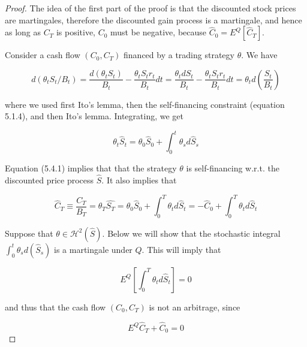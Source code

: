 \documentclass[\topdir/lecture\_notes.tex]{subfiles}
\begin{document}
\begin{proof}
The idea of the first part of the proof is that the discounted stock prices are martingales, therefore the discounted gain process is a martingale, and hence as long as \(C_{T}\) is positive, \(C_{0}\) must be negative, because \(\hat{C}_{0}=E^{Q}\left[\hat{C}_{T}\right]\).

Consider a cash flow \(\left(C_{0}, C_{T}\right)\) financed by a trading strategy \(\theta\). We have

\begin{equation*}
d\left(\theta_{t} S_{t}/B_{t}\right)=\frac{d\left(\theta_{t} S_{t}\right)}{B_{t}}-\frac{\theta_{t} S_{t} r_{t}}{B_{t}} d t=\frac{\theta_{t} d S_{t}}{B_{t}}-\frac{\theta_{t} S_{t} r_{t}}{B_{t}} d t=\theta_{t} d\left(\frac{S_{t}}{B_{t}}\right)
\end{equation*}

where we used first Ito's lemma, then the self-financing constraint (equation 5.1.4), and then Ito's lemma. Integrating, we get

\begin{equation*}
\theta_{t} \hat{S}_{t}=\theta_{0} \hat{S}_{0}+\int_{0}^{t} \theta_{s} d \hat{S}_{s}
\end{equation*}

Equation (5.4.1) implies that that the strategy \(\theta\) is self-financing w.r.t. the discounted price process \(\hat{S}\). It also implies that

\begin{equation*}
\hat{C}_{T} \equiv \frac{C_{T}}{B_{T}}=\theta_{T} \hat{S_{T}}=\theta_{0} \hat{S}_{0}+\int_{0}^{T} \theta_{t} d \hat{S}_{t}=-\hat{C}_{0}+\int_{0}^{T} \theta_{t} d \hat{S}_{t}
\end{equation*}

Suppose that \(\theta \in \mathcal{H}^{2}(\hat{S})\). Below we will show that the stochastic integral \(\int_{0}^{t} \theta_{s} d\left(\hat{S}_{s}\right)\) is a martingale under \(Q\). This will imply that

\begin{equation*}
E^{Q}\left[\int_{0}^{T} \theta_{t} d \hat{S}_{t}\right]=0
\end{equation*}

and thus that the cash flow \(\left(C_{0}, C_{T}\right)\) is not an arbitrage, since

\begin{equation*}
E^{Q} \hat{C}_{T}+\hat{C}_{0}=0
\end{equation*}


\end{proof}
\end{document}
